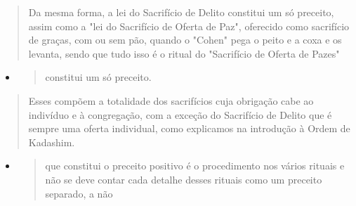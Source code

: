 \begin{quote}
Da mesma forma, a lei do Sacrifício de Delito constitui um só pre­ceito,
assim como a "lei do Sacrifício de Oferta de Paz", oferecido como
sacri­fício de graças, com ou sem pão, quando o "Cohen" pega o peito e a
coxa e os levanta, sendo que tudo isso é o ritual do "Sacrifício de
Oferta de Pazes"
\end{quote}

\begin{itemize}
\item
  \begin{quote}
  constitui um só preceito.
  \end{quote}
\end{itemize}

\begin{quote}
Esses compõem a totalidade dos sacrifícios cuja obrigação cabe ao
indivíduo e à congregação, com a exceção do Sacrifício de Delito que é
sempre uma oferta individual, como explicamos na introdução à Ordem de
Kadashim.
\end{quote}

\begin{itemize}
\item
  \begin{quote}
  que constitui o preceito positivo é o procedimento nos vários rituais
  e não se deve contar cada detalhe desses rituais como um preceito
  separado, a não
  \end{quote}
\end{itemize}

